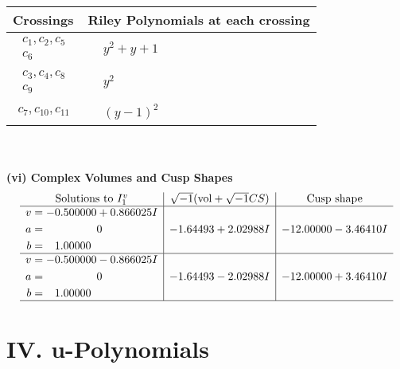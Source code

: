 \documentclass[1p]{elsarticle_modified}
\theoremstyle{definition}
\newcommand{\I}{\sqrt{-1}}
\begin{document}
\begin{tabular}{m{50pt}|m{274pt}}
Crossings & \hspace{64pt}Riley Polynomials at each crossing \\
\hline $$\begin{aligned}c_{1},c_{2},c_{5}\\c_{6}\end{aligned}$$&$\begin{aligned}
&y^2+y+1
\end{aligned}$\\
\hline $$\begin{aligned}c_{3},c_{4},c_{8}\\c_{9}\end{aligned}$$&$\begin{aligned}
&y^2
\end{aligned}$\\
\hline $$\begin{aligned}c_{7},c_{10},c_{11}\end{aligned}$$&$\begin{aligned}
&(y-1)^2
\end{aligned}$\\
\hline
\end{tabular}\\~\\
\newpage\flushleft \textbf{(vi) Complex Volumes and Cusp Shapes}
$$\begin{array}{c|c|c}  
\text{Solutions to }I^v_{1}& \I (\text{vol} + \sqrt{-1}CS) & \text{Cusp shape}\\
 \hline 
\begin{aligned}
v &= -0.500000 + 0.866025 I \\
a &= \phantom{-0.000000 } 0 \\
b &= \phantom{-}1.00000\phantom{ +0.000000I}\end{aligned}
 & -1.64493 + 2.02988 I & -12.00000 - 3.46410 I \\ \hline\begin{aligned}
v &= -0.500000 - 0.866025 I \\
a &= \phantom{-0.000000 } 0 \\
b &= \phantom{-}1.00000\phantom{ +0.000000I}\end{aligned}
 & -1.64493 - 2.02988 I & -12.00000 + 3.46410 I\\
 \hline 
 \end{array}$$\newpage
\newpage\renewcommand{\arraystretch}{1}
\centering \section*{ IV. u-Polynomials}
\end{document}
